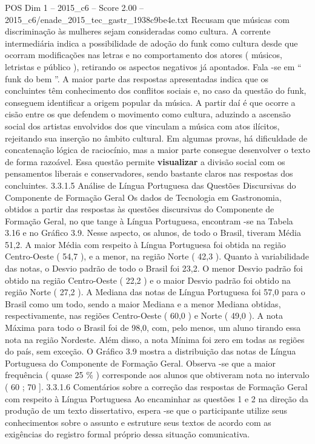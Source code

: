 \begin{textsample}{POS Dim 1 – 2015\_c6 – Score 2.00 – 2015\_c6/enade\_2015\_tec\_gastr\_1938c9be4e.txt}
Recusam que músicas com discriminação às mulheres sejam consideradas como cultura.
A corrente intermediária indica a possibilidade de adoção do funk como cultura desde que ocorram modificações nas letras e no comportamento dos atores ( músicos, letristas e público ), retirando os aspectos negativos já apontados.
Fala -se em “ funk do bem ”.
A maior parte das respostas apresentadas indica que os concluintes têm conhecimento dos conflitos sociais e, no caso da questão do funk, conseguem identificar a origem popular da música.
A partir daí é que ocorre a cisão entre os que defendem o movimento como cultura, aduzindo a ascensão social dos artistas envolvidos dos que vinculam a música com atos ilícitos, rejeitando sua inserção no âmbito cultural.
Em algumas provas, há dificuldade de concatenação lógica de raciocínio, mas a maior parte consegue desenvolver o texto de forma razoável.
Essa questão permite \textbf{visualizar} a divisão social com os pensamentos liberais e conservadores, sendo bastante claros nas respostas dos concluintes. 3.3.1.5 Análise de Língua Portuguesa das Questões Discursivas do Componente de Formação Geral Os dados de Tecnologia em Gastronomia, obtidos a partir das respostas às questões discursivas do Componente de Formação Geral, no que tange à Língua Portuguesa, encontram -se na Tabela 3.16 e no Gráfico 3.9.
Nesse aspecto, os alunos, de todo o Brasil, tiveram Média 51,2.
A maior Média com respeito à Língua Portuguesa foi obtida na região Centro-Oeste ( 54,7 ), e a menor, na região Norte ( 42,3 ).
Quanto à variabilidade das notas, o Desvio padrão de todo o Brasil foi 23,2.
O menor Desvio padrão foi obtido na região Centro-Oeste ( 22,2 ) e o maior Desvio padrão foi obtido na região Norte ( 27,2 ).
A Mediana das notas de Língua Portuguesa foi 57,0 para o Brasil como um todo, sendo a maior Mediana e a menor Mediana obtidas, respectivamente, nas regiões Centro-Oeste ( 60,0 ) e Norte ( 49,0 ).
A nota Máxima para todo o Brasil foi de 98,0, com, pelo menos, um aluno tirando essa nota na região Nordeste.
Além disso, a nota Mínima foi zero em todas as regiões do país, sem exceção.
O Gráfico 3.9 mostra a distribuição das notas de Língua Portuguesa do Componente de Formação Geral.
Observa -se que a maior frequência ( quase 25 \% ) corresponde aos alunos que obtiveram nota no intervalo ( 60 ; 70 ]. 3.3.1.6 Comentários sobre a correção das respostas de Formação Geral com respeito à Língua Portuguesa Ao encaminhar as questões 1 e 2 na direção da produção de um texto dissertativo, espera -se que o participante utilize seus conhecimentos sobre o assunto e estruture seus textos de acordo com as exigências do registro formal próprio dessa situação comunicativa.

\end{textsample}
